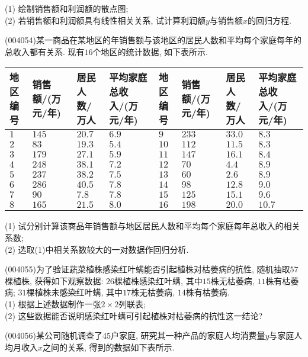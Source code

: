 (1) 绘制销售额和利润额的散点图;\\
(2) 若销售额和利润额具有线性相关关系, 试计算利润额$y$与销售额$x$的回归方程.
\item (004054)某一商品在某地区的年销售额与该地区的居民人数和平均每个家庭每年的总收入都有关系. 现有$16$个地区的统计数据, 如下表所示.
\begin{center}
    \begin{tabular}{|p{}<{\centering}|p{}<{\centering}|p{}<{\centering}|p{}<{\centering}||p{}<{\centering}|p{}<{\centering}|p{}<{\centering}|p{}<{\centering}|}
        \hline
        地区编号 & 销售额/(万元/年) & 居民人数/万人 & 平均家庭总收入/(万元/年) & 地区编号 & 销售额/(万元/年) & 居民人数/万人 & 平均家庭总收入/(万元/年)\\ \hline 
        $1$ & $145$ & $20.7$ & $6.9$ & $9$ & $233$ & $33.0$ & $8.3$\\ \hline 
        $2$ & $83$ & $19.3$ & $5.4$ & $10$ & $112$ & $11.5$ & $8.3$\\ \hline 
        $3$ & $179$ & $27.1$ & $5.9$ & $11$ & $147$ & $16.1$ & $8.4$\\ \hline 
        $4$ & $248$ & $38.1$ & $7.2$ & $12$ & $70$ & $4.4$ & $8.9$\\ \hline 
        $5$ & $237$ & $38.2$ & $7.5$ & $13$ & $60$ & $2.6$ & $8.9$\\ \hline 
        $6$ & $286$ & $40.5$ & $7.8$ & $14$ & $98$ & $12.8$ & $9.0$\\ \hline 
        $7$ & $90$ & $7.8$ & $7.8$ & $15$ & $125$ & $15.1$ & $9.6$\\ \hline 
        $8$ & $165$ & $21.5$ & $8.0$ & $16$ & $198$ & $20.0$ & $10.7$\\ \hline 
    \end{tabular}
\end{center}
(1) 试分别计算该商品年销售额与地区居民人数和平均每个家庭每年总收入的相关
系数;\\
(2) 选取(1)中相关系数较大的一对数据作回归分析.
\item (004055)为了验证蔬菜植株感染红叶螨能否引起植株对枯萎病的抗性, 随机抽取$57$棵植株, 获得如下观察数据: $26$棵植株感染红叶螨, 其中$15$株无枯萎病, $11$株有枯萎病; $31$棵植株未感染红叶螨, 其中$17$株无枯萎病, $14$株有枯萎病.\\
(1) 根据上述数据制作一张$2\times 2$列联表;\\
(2) 这些数据能否说明感染红叶螨可引起植株对枯萎病的抗性这一结论?
\item (004056)某公司随机调查了$45$户家庭, 研究其一种产品的家庭人均消费量$y$与家庭人均月收入$x$之间的关系, 得到的数据如下表所示.
